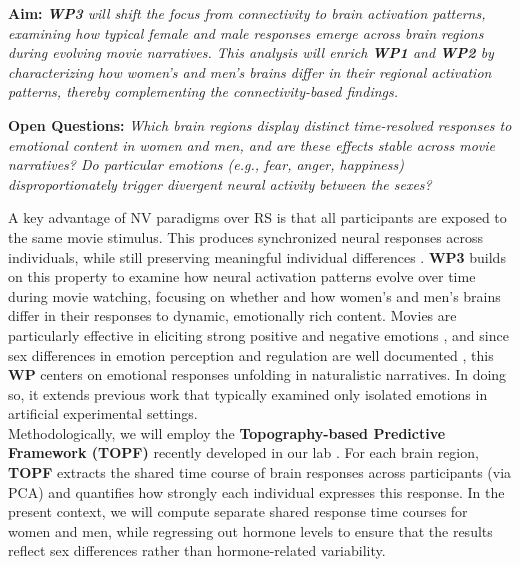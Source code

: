 \documentclass[11pt,a4paper]{article}
\begin{document}
\textbf{Aim:} \textit{\textbf{WP3} will shift the focus from connectivity to brain activation patterns, examining how typical 
female and male responses emerge across brain regions during evolving movie narratives. This analysis will enrich \textbf{WP1} 
and \textbf{WP2}  by characterizing how women's and men's brains differ in their regional activation patterns, 
thereby complementing the connectivity-based findings.}

\textbf{Open Questions:} \textit{Which brain regions display distinct time-resolved responses to emotional content in 
women and men, and are these effects stable across movie narratives? Do particular emotions (e.g., fear, anger, happiness) 
disproportionately trigger divergent neural activity between the sexes?}

A key advantage of NV paradigms over RS is that all participants are exposed to the same movie stimulus. 
This produces synchronized neural responses across individuals, while still preserving meaningful individual 
differences \parencite{finnIdiosynchronySharedResponses2020a,vanderwalIndividualDifferencesFunctional2017}. 
\textbf{WP3} builds on this property to examine how neural activation patterns evolve over time during movie watching, 
focusing on whether and how women's and men's brains differ in their responses to dynamic, emotionally 
rich content. Movies are particularly effective in eliciting strong positive and negative 
emotions \parencite{grossEmotionElicitationUsing1995,westermannRelativeEffectivenessValidity1996}, 
and since sex differences in emotion perception and regulation are well documented 
\parencite{domesNeuralCorrelatesSex2010a,gardenerSexDifferencesEmotion2013a}, 
this \textbf{WP} centers on emotional responses unfolding in naturalistic narratives. 
In doing so, it extends previous work that typically examined only isolated emotions in artificial experimental settings.\\  
Methodologically, we will employ the \textbf{Topography-based Predictive Framework (TOPF)} recently developed in our 
lab \parencite{liTopographybasedPredictiveFramework2023a}. For each brain region, \textbf{TOPF} extracts the shared time 
course of brain responses across participants (via PCA) and quantifies how strongly each individual expresses this response. 
In the present context, we will compute separate shared response time courses for women and men, while regressing out hormone 
levels to ensure that the results reflect sex differences rather than hormone-related variability.\\ 
\end{document}
